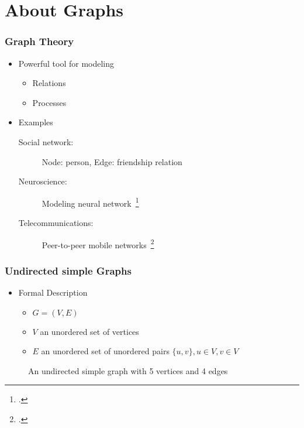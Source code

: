 \section{About Graphs}
\begin{frame}
	\frametitle{Graph Theory}
	\begin{itemize}
		\item Powerful tool for modeling
			\begin{itemize}
				\item Relations
				\item Processes
			\end{itemize}
		\item Examples
			\begin{description}
				\item [Social network:] Node: person, Edge: friendship relation
				\item [Neuroscience:] Modeling neural network~\footcite{BuSp09}
				\item [Telecommunications:] Peer-to-peer mobile networks~\footcite{FaCh99}
			\end{description}
	\end{itemize}
\end{frame}

\begin{frame}
	\frametitle{Undirected simple Graphs}
	\begin{itemize}
		\item Formal Description
			\begin{itemize}
				\item $G = (V,E)$
				\item $V$ an unordered set of vertices
				\item $E$ an unordered set of unordered pairs $\{u,v\}, u \in V, v \in V$
			\end{itemize}
	\end{itemize}
	\begin{figure}
		\begin{center}
			
		\end{center}
		\caption{An undirected simple graph with 5 vertices and 4 edges}
	\end{figure}
\end{frame}


